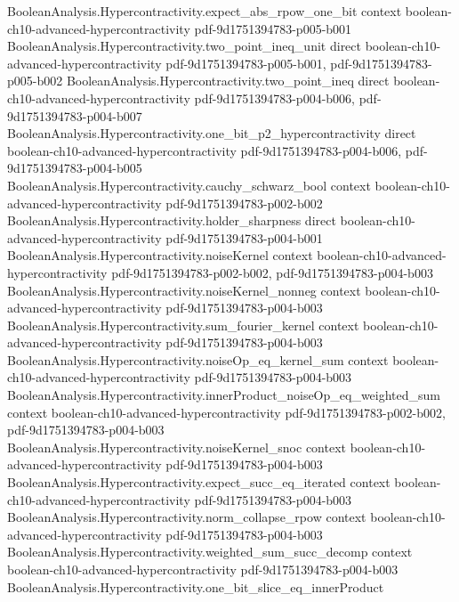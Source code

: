 \begin{theorem}
  {BooleanAnalysis.Hypercontractivity.expect_abs_rpow_one_bit}
  {context}
  {boolean-ch10-advanced-hypercontractivity}
  {pdf-9d1751394783-p005-b001}
\proofstep
  {BooleanAnalysis.Hypercontractivity.two_point_ineq_unit}
  {direct}
  {boolean-ch10-advanced-hypercontractivity}
  {pdf-9d1751394783-p005-b001,
    pdf-9d1751394783-p005-b002}
\proofstep
  {BooleanAnalysis.Hypercontractivity.two_point_ineq}
  {direct}
  {boolean-ch10-advanced-hypercontractivity}
  {pdf-9d1751394783-p004-b006,
    pdf-9d1751394783-p004-b007}
\proofstep
  {BooleanAnalysis.Hypercontractivity.one_bit_p2_hypercontractivity}
  {direct}
  {boolean-ch10-advanced-hypercontractivity}
  {pdf-9d1751394783-p004-b006,
    pdf-9d1751394783-p004-b005}
\proofstep
  {BooleanAnalysis.Hypercontractivity.cauchy_schwarz_bool}
  {context}
  {boolean-ch10-advanced-hypercontractivity}
  {pdf-9d1751394783-p002-b002}
\proofstep
  {BooleanAnalysis.Hypercontractivity.holder_sharpness}
  {direct}
  {boolean-ch10-advanced-hypercontractivity}
  {pdf-9d1751394783-p004-b001}
\proofstep
  {BooleanAnalysis.Hypercontractivity.noiseKernel}
  {context}
  {boolean-ch10-advanced-hypercontractivity}
  {pdf-9d1751394783-p002-b002,
    pdf-9d1751394783-p004-b003}
\proofstep
  {BooleanAnalysis.Hypercontractivity.noiseKernel_nonneg}
  {context}
  {boolean-ch10-advanced-hypercontractivity}
  {pdf-9d1751394783-p004-b003}
\proofstep
  {BooleanAnalysis.Hypercontractivity.sum_fourier_kernel}
  {context}
  {boolean-ch10-advanced-hypercontractivity}
  {pdf-9d1751394783-p004-b003}
\proofstep
  {BooleanAnalysis.Hypercontractivity.noiseOp_eq_kernel_sum}
  {context}
  {boolean-ch10-advanced-hypercontractivity}
  {pdf-9d1751394783-p004-b003}
\proofstep
  {BooleanAnalysis.Hypercontractivity.innerProduct_noiseOp_eq_weighted_sum}
  {context}
  {boolean-ch10-advanced-hypercontractivity}
  {pdf-9d1751394783-p002-b002,
    pdf-9d1751394783-p004-b003}
\proofstep
  {BooleanAnalysis.Hypercontractivity.noiseKernel_snoc}
  {context}
  {boolean-ch10-advanced-hypercontractivity}
  {pdf-9d1751394783-p004-b003}
\proofstep
  {BooleanAnalysis.Hypercontractivity.expect_succ_eq_iterated}
  {context}
  {boolean-ch10-advanced-hypercontractivity}
  {pdf-9d1751394783-p004-b003}
\proofstep
  {BooleanAnalysis.Hypercontractivity.norm_collapse_rpow}
  {context}
  {boolean-ch10-advanced-hypercontractivity}
  {pdf-9d1751394783-p004-b003}
\proofstep
  {BooleanAnalysis.Hypercontractivity.weighted_sum_succ_decomp}
  {context}
  {boolean-ch10-advanced-hypercontractivity}
  {pdf-9d1751394783-p004-b003}
\proofstep
  {BooleanAnalysis.Hypercontractivity.one_bit_slice_eq_innerProduct}

\end{theorem}
